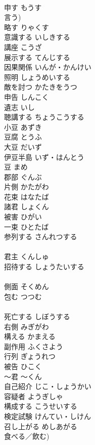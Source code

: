 \documentclass[8pt]{extreport}
\begin{document}
\begin{CJK}{UTF8}{min}
\\	申す	もうす	
\\	言う)
\\	略す	りゃくす	
\\	意識する	いしきする	
\\	講座	こうざ	
\\	展示する	てんじする	
\\	因果関係	いんが・かんけい	
\\	照明	しょうめいする	
\\	敵を討つ	かたきをうつ	
\\	申告	しんこく	
\\	遺志	いし	
\\	聴講する	ちょうこうする	
\\	小豆	あずき	
\\	豆腐	とうふ	
\\	大豆	だいず	
\\	伊豆半島	いず・はんとう	
\\	豆	まめ	
\\	郡部	ぐんぶ	
\\	片側	かたがわ	
\\	花束	はなたば	
\\	諸君	しょくん	
\\	被害	ひがい	
\\	一束	ひとたば	
\\	参列する	さんれつする	
\\	[漢語]
\\	君主	くんしゅ	
\\	招待する	しょうたいする	
\\	[漢語]
\\	側面	そくめん	
\\	包む	つつむ	
\\	[和語]
\\	死亡する	しぼうする	
\\	右側	みぎがわ	
\\	構える	かまえる	
\\	副作用	ふくさよう	
\\	行列	ぎょうれつ	
\\	被告	ひこく	
\\	～君	～くん	
\\	自己紹介	じこ・しょうかい	
\\	容疑者	ようぎしゃ	
\\	構成する	こうせいする	
\\	検定試験	けんてい・しけん	
\\	召し上がる	めしあがる	
\\	食べる／飲む)

\end{CJK}
\end{document}
